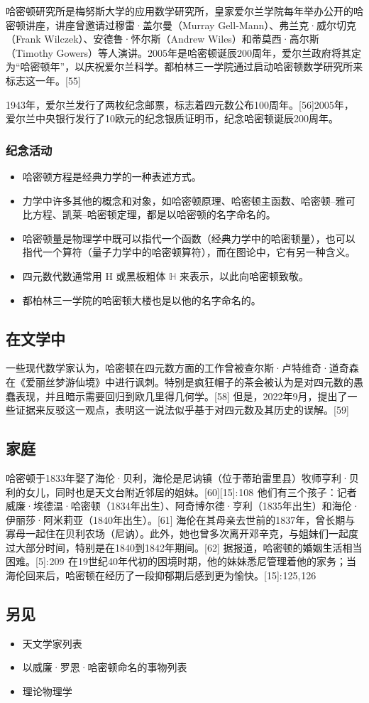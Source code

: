 哈密顿研究所是梅努斯大学的应用数学研究所，皇家爱尔兰学院每年举办公开的哈密顿讲座，讲座曾邀请过穆雷·盖尔曼（Murray Gell-Mann）、弗兰克·威尔切克（Frank Wilczek）、安德鲁·怀尔斯（Andrew Wiles）和蒂莫西·高尔斯（Timothy Gowers）等人演讲。2005年是哈密顿诞辰200周年，爱尔兰政府将其定为“哈密顿年”，以庆祝爱尔兰科学。都柏林三一学院通过启动哈密顿数学研究所来标志这一年。[55]

1943年，爱尔兰发行了两枚纪念邮票，标志着四元数公布100周年。[56]2005年，爱尔兰中央银行发行了10欧元的纪念银质证明币，纪念哈密顿诞辰200周年。
\subsubsection{纪念活动}
\begin{itemize}
\item 哈密顿方程是经典力学的一种表述方式。  
\item 力学中许多其他的概念和对象，如哈密顿原理、哈密顿主函数、哈密顿–雅可比方程、凯莱–哈密顿定理，都是以哈密顿的名字命名的。  
\item 哈密顿量是物理学中既可以指代一个函数（经典力学中的哈密顿量），也可以指代一个算符（量子力学中的哈密顿算符），而在图论中，它有另一种含义。  
\item 四元数代数通常用 H 或黑板粗体 \(\mathbb{H}\) 来表示，以此向哈密顿致敬。  
\item 都柏林三一学院的哈密顿大楼也是以他的名字命名的。
\end{itemize}
\subsection{在文学中} 
一些现代数学家认为，哈密顿在四元数方面的工作曾被查尔斯·卢特维奇·道奇森在《爱丽丝梦游仙境》中进行讽刺。特别是疯狂帽子的茶会被认为是对四元数的愚蠢表现，并且暗示需要回归到欧几里得几何学。[58] 但是，2022年9月，提出了一些证据来反驳这一观点，表明这一说法似乎基于对四元数及其历史的误解。[59]
\subsection{家庭} 
哈密顿于1833年娶了海伦·贝利，海伦是尼讷镇（位于蒂珀雷里县）牧师亨利·贝利的女儿，同时也是天文台附近邻居的姐妹。[60][15]: 108  他们有三个孩子：记者威廉·埃德温·哈密顿（1834年出生）、阿奇博尔德·亨利（1835年出生）和海伦·伊丽莎·阿米莉亚（1840年出生）。[61] 海伦在其母亲去世前的1837年，曾长期与寡母一起住在贝利农场（尼讷）。此外，她也曾多次离开邓辛克，与姐妹们一起度过大部分时间，特别是在1840到1842年期间。[62] 据报道，哈密顿的婚姻生活相当困难。[5]: 209  在19世纪40年代初的困境时期，他的妹妹悉尼管理着他的家务；当海伦回来后，哈密顿在经历了一段抑郁期后感到更为愉快。[15]: 125, 126
\subsection{另见} 
\begin{itemize}
\item 天文学家列表  
\item 以威廉·罗恩·哈密顿命名的事物列表  
\item 理论物理学
\end{itemize}